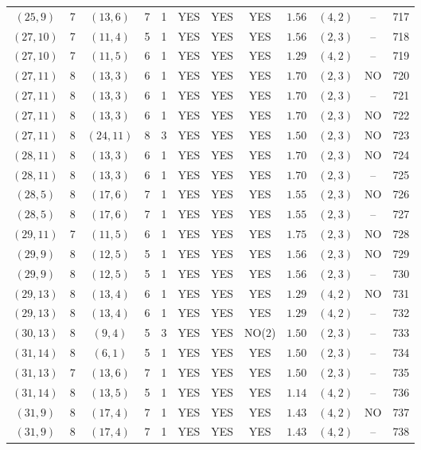 \begin{longtable}{|c|c|c|c|c|c|c|c|c|c|c|c|}
$(25,9)$ & 7 & $(13,6)$ & 7 & 1 & YES & YES & YES & $1.56$ & $(4,2)$ & -- & 717\\
$(27,10)$ & 7 & $(11,4)$ & 5 & 1 & YES & YES & YES & $1.56$ & $(2,3)$ & -- & 718\\
$(27,10)$ & 7 & $(11,5)$ & 6 & 1 & YES & YES & YES & $1.29$ & $(4,2)$ & -- & 719\\
$(27,11)$ & 8 & $(13,3)$ & 6 & 1 & YES & YES & YES & $1.70$ & $(2,3)$ & NO & 720\\
$(27,11)$ & 8 & $(13,3)$ & 6 & 1 & YES & YES & YES & $1.70$ & $(2,3)$ & -- & 721\\
$(27,11)$ & 8 & $(13,3)$ & 6 & 1 & YES & YES & YES & $1.70$ & $(2,3)$ & NO & 722\\
$(27,11)$ & 8 & $(24,11)$ & 8 & 3 & YES & YES & YES & $1.50$ & $(2,3)$ & NO & 723\\
$(28,11)$ & 8 & $(13,3)$ & 6 & 1 & YES & YES & YES & $1.70$ & $(2,3)$ & NO & 724\\
$(28,11)$ & 8 & $(13,3)$ & 6 & 1 & YES & YES & YES & $1.70$ & $(2,3)$ & -- & 725\\
$(28,5)$ & 8 & $(17,6)$ & 7 & 1 & YES & YES & YES & $1.55$ & $(2,3)$ & NO & 726\\
$(28,5)$ & 8 & $(17,6)$ & 7 & 1 & YES & YES & YES & $1.55$ & $(2,3)$ & -- & 727\\
$(29,11)$ & 7 & $(11,5)$ & 6 & 1 & YES & YES & YES & $1.75$ & $(2,3)$ & NO & 728\\
$(29,9)$ & 8 & $(12,5)$ & 5 & 1 & YES & YES & YES & $1.56$ & $(2,3)$ & NO & 729\\
$(29,9)$ & 8 & $(12,5)$ & 5 & 1 & YES & YES & YES & $1.56$ & $(2,3)$ & -- & 730\\
$(29,13)$ & 8 & $(13,4)$ & 6 & 1 & YES & YES & YES & $1.29$ & $(4,2)$ & NO & 731\\
$(29,13)$ & 8 & $(13,4)$ & 6 & 1 & YES & YES & YES & $1.29$ & $(4,2)$ & -- & 732\\
$(30,13)$ & 8 & $(9,4)$ & 5 & 3 & YES & YES & NO(2) & $1.50$ & $(2,3)$ & -- & 733\\
$(31,14)$ & 8 & $(6,1)$ & 5 & 1 & YES & YES & YES & $1.50$ & $(2,3)$ & -- & 734\\
$(31,13)$ & 7 & $(13,6)$ & 7 & 1 & YES & YES & YES & $1.50$ & $(2,3)$ & -- & 735\\
$(31,14)$ & 8 & $(13,5)$ & 5 & 1 & YES & YES & YES & $1.14$ & $(4,2)$ & -- & 736\\
$(31,9)$ & 8 & $(17,4)$ & 7 & 1 & YES & YES & YES & $1.43$ & $(4,2)$ & NO & 737\\
$(31,9)$ & 8 & $(17,4)$ & 7 & 1 & YES & YES & YES & $1.43$ & $(4,2)$ & -- & 738\\

\end{longtable}
